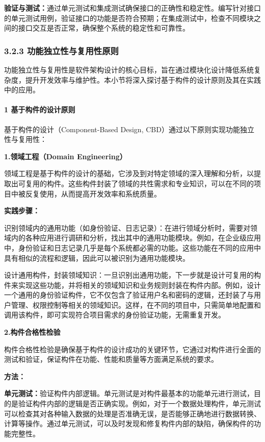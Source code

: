 \textbf{验证与测试：}通过单元测试和集成测试确保接口的正确性和稳定性。编写针对接口的单元测试用例，验证接口的功能是否符合预期；在集成测试中，检查不同模块之间的接口交互是否正常，确保整个系统的稳定性和可靠性。

\subsubsection{3.2.3 功能独立性与复用性原则}\label{ux529fux80fdux72ecux7acbux6027ux4e0eux590dux7528ux6027ux539fux5219}

功能独立性与复用性是软件架构设计的核心目标，旨在通过模块化设计降低系统复杂度，提升开发效率与维护性。本小节将深入探讨基于构件的设计原则及其在实践中的应用。

\paragraph{1 基于构件的设计原则}\label{ux57faux4e8eux6784ux4ef6ux7684ux8bbeux8ba1ux539fux5219}

基于构件的设计（Component-Based Design, CBD）通过以下原则实现功能独立性与复用性：

\textbf{1.领域工程（Domain Engineering）}

领域工程是基于构件的设计的基础，它涉及到对特定领域的深入理解和分析，以提取出可复用的构件。这些构件封装了领域的共性需求和专业知识，可以在不同的项目中被反复使用，从而提高开发效率和系统质量。

\textbf{实践步骤：}

识别领域内的通用功能（如身份验证、日志记录）：在进行领域分析时，需要对领域内的各种应用进行调研和分析，找出其中的通用功能模块。例如，在企业级应用中，身份验证和日志记录几乎是每个系统都必需的功能。这些功能在不同的应用中具有相似的流程和逻辑，因此可以被识别为通用功能模块。

设计通用构件，封装领域知识：一旦识别出通用功能，下一步就是设计可复用的构件来实现这些功能，并将相关的领域知识和业务规则封装在构件内部。例如，设计一个通用的身份验证构件，它不仅包含了验证用户名和密码的逻辑，还封装了与用户管理、权限控制等相关的领域知识。这样，在不同的项目中，只需简单地配置和调用该构件，即可实现符合项目需求的身份验证功能，无需重复开发。

\textbf{2.构件合格性检验}

构件合格性检验是确保基于构件的设计成功的关键环节，它通过对构件进行全面的测试和验证，保证构件在功能、性能和质量等方面满足系统的要求。

\textbf{方法：}

\textbf{单元测试：}验证构件内部逻辑。单元测试是对构件最基本的功能单元进行测试，目的是验证构件内部的逻辑是否正确实现。例如，对于一个数据处理构件，单元测试可以检查其对各种输入数据的处理是否准确无误，是否能够正确地进行数据转换、计算等操作。通过单元测试，可以及时发现和修复构件内部的缺陷，确保构件的功能完整性。

